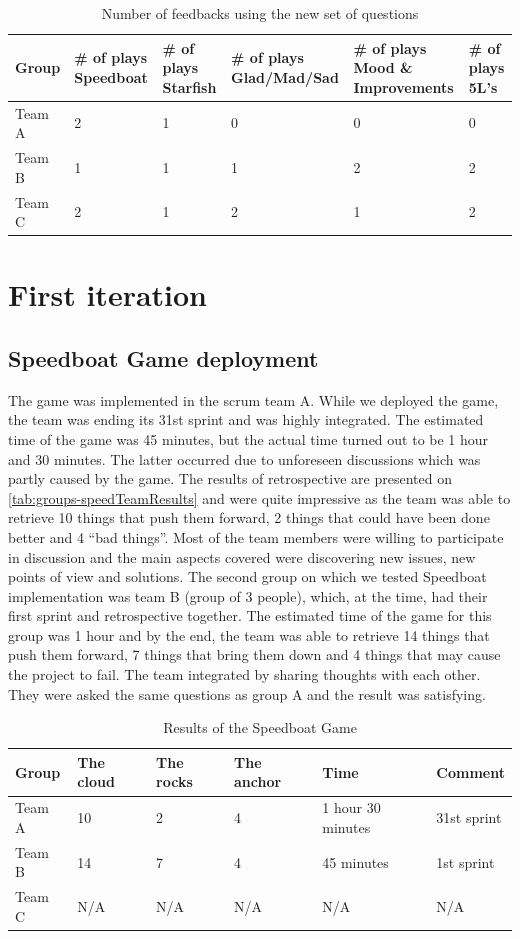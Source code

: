 \begin{table}[!htbp]
	\caption{Number of feedbacks using the new set of questions}
	\label{tab:groups-nPlaysNewSet}
	\begin{tabularx}{\textwidth}{|X|X|X|X|X|X|}
	\hline
		Group & \# of plays Speedboat & \# of plays Starfish & \# of plays Glad/Mad/Sad & \# of plays Mood \& Improvements & \# of plays 5L's \\ \hline
		Team A & 2 & 1 & 0 & 0 & 0 \\ \hline
		Team B & 1 & 1 & 1 & 2 & 2\\ \hline
        Team C & 2 & 1 & 2 & 1 & 2 \\ \hline
	\end{tabularx}
\end{table}

\section{First iteration}
\label{sec:firstIt}
\subsection{Speedboat Game deployment}
The game was implemented in the scrum team A. While we deployed the game, the team was ending its 31st sprint and was highly integrated. The estimated time of the game was 45 minutes, but the actual time turned out to be 1 hour and 30 minutes. The latter occurred due to unforeseen discussions which was partly caused by the game. The results of retrospective are presented on \autoref{tab:groups-speedTeamResults} and were quite impressive as the team was able to retrieve 10 things that push them forward, 2 things that could have been done better and 4 “bad things”. Most of the team members were willing to participate in discussion and the main aspects covered were discovering new issues, new points of view and solutions.
The second group on which we tested Speedboat implementation was team B (group of 3 people), which, at the time, had their first sprint and retrospective together. The estimated time of the game for this group was 1 hour and by the end, the team was able to retrieve 14 things that push them forward, 7 things that bring them down and 4 things that may cause the project to fail. The team integrated by sharing thoughts with each other. They were asked the same questions as group A and the result was satisfying. 

\begin{table}[!htbp]
	\caption{Results of the Speedboat Game}
	\label{tab:groups-speedTeamResults}
	\begin{tabularx}{\textwidth}{|X|X|X|X|X|X|}
	\hline
		Group & The cloud & The rocks & The anchor & Time & Comment\\ \hline
		Team A & 10 & 2 & 4 & 1 hour 30 minutes & 31st sprint \\ \hline
		Team B & 14 & 7 & 4 & 45 minutes & 1st sprint\\ \hline
        Team C & N/A & N/A & N/A & N/A & N/A\\ \hline
	\end{tabularx}
\end{table}

